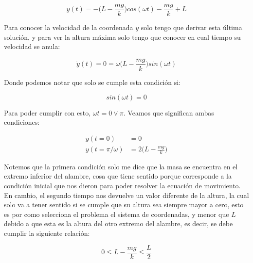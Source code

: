 \documentclass{article}
\begin{document}
\begin{multicols}{2}
\begin{equation}
    y(t) = - \bigg( L - \frac{mg}{k} \bigg)cos(\omega t) - \frac{mg}{k} + L
\end{equation}

Para conocer la velocidad de la coordenada $y$ solo tengo que derivar esta última solución, y para ver la altura máxima solo tengo que conocer en cual tiempo su velocidad se anula:

\begin{equation}
    \dot{y}(t) = 0 = \omega \bigg(L - \frac{mg}{k}\bigg)sin(\omega t)
\end{equation}

Donde podemos notar que solo se cumple esta condición si:

\begin{equation}
    sin(\omega t) = 0
\end{equation}

Para poder cumplir con esto, $\omega t = 0 \vee \pi$. Veamos que significan ambas condiciones:

\begin{equation}
    \begin{split}
        y(t = 0) &= 0 \\
        y(t = \pi/\omega) &= 2 \bigg( L - \frac{mg}{k} \bigg)
    \end{split}
\end{equation}

Notemos que la primera condición solo me dice que la masa se encuentra en el extremo inferior del alambre, cosa que tiene sentido porque corresponde a la condición inicial que nos dieron para poder resolver la ecuación de movimiento. En cambio, el segundo tiempo nos devuelve un valor diferente de la altura, la cual solo va a tener sentido si se cumple que su altura sea siempre mayor a cero, esto es por como selecciona el problema el sistema de coordenadas, y menor que $L$ debido a que esta es la altura del otro extremo del alambre, es decir, se debe cumplir la siguiente relación:

\begin{equation}
    0 \leq L - \frac{mg}{k} \leq \frac{L}{2}
\end{equation}

\end{multicols}
\end{document}
